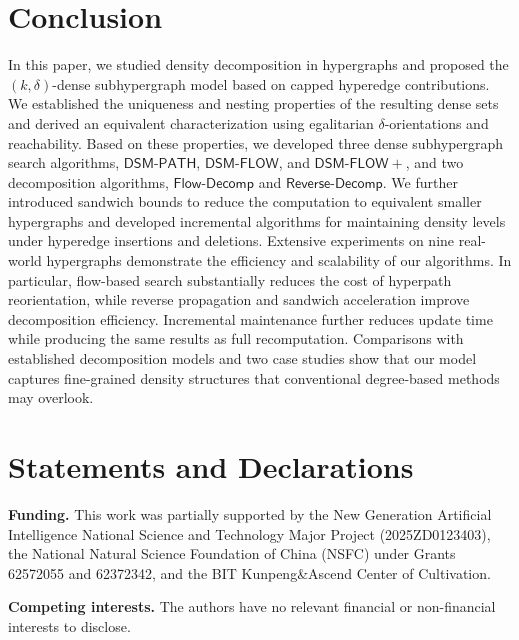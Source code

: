 \documentclass[twocolumn]{svjour3}
\newcommand{\kw}[1]{{\ensuremath{\mathsf{#1}}}\xspace}
\newcommand{\stitle}[1]{\par\noindent\textbf{#1}}
\begin{document}
\section{Conclusion}
In this paper, we studied density decomposition in hypergraphs and proposed the $(k,\delta)$-dense subhypergraph model based on capped hyperedge contributions. We established the uniqueness and nesting properties of the resulting dense sets and derived an equivalent characterization using egalitarian $\delta$-orientations and reachability. Based on these properties, we developed three dense subhypergraph search algorithms, \kw{DSM\text{-}PATH}, \kw{DSM\text{-}FLOW}, and \kw{DSM\text{-}FLOW+}, and two decomposition algorithms, \kw{Flow\text{-}Decomp} and \kw{Reverse\text{-}Decomp}. We further introduced sandwich bounds to reduce the computation to equivalent smaller hypergraphs and developed incremental algorithms for maintaining density levels under hyperedge insertions and deletions.
Extensive experiments on nine real-world hypergraphs demonstrate the efficiency and scalability of our algorithms. In particular, flow-based search substantially reduces the cost of hyperpath reorientation, while reverse propagation and sandwich acceleration improve decomposition efficiency. Incremental maintenance further reduces update time while producing the same results as full recomputation. Comparisons with established decomposition models and two case studies show that our model captures fine-grained density structures that conventional degree-based methods may overlook.

\section*{Statements and Declarations}
\stitle{Funding.}
This work was partially supported by the New Generation Artificial Intelligence National Science and Technology Major Project (2025ZD0123403), the National Natural Science Foundation of China (NSFC) under Grants 62572055 and 62372342, and the BIT Kunpeng\&Ascend Center of Cultivation. 

\stitle{Competing interests.}
The authors have no relevant financial or non-financial interests to disclose.



\end{document}
